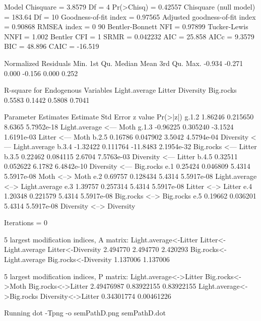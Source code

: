 \documentclass[12pt]{article}
\begin{document}
\begin{Schunk}
\begin{Soutput}
 Model Chisquare =  3.8579   Df =  4 Pr(>Chisq) = 0.42557
 Chisquare (null model) =  183.64   Df =  10
 Goodness-of-fit index =  0.97565
 Adjusted goodness-of-fit index =  0.90868
 RMSEA index =  0   90%
 Bentler-Bonnett NFI =  0.97899
 Tucker-Lewis NNFI =  1.002
 Bentler CFI =  1
 SRMR =  0.042232
 AIC =  25.858
 AICc =  9.3579
 BIC =  48.896
 CAIC =  -16.519

 Normalized Residuals
   Min. 1st Qu.  Median    Mean 3rd Qu.    Max. 
 -0.934  -0.271   0.000  -0.156   0.000   0.252 

 R-square for Endogenous Variables
Light.average        Litter     Diversity     Big.rocks 
       0.5583        0.1442        0.5808        0.7041 

 Parameter Estimates
      Estimate Std Error z value  Pr(>|z|)                                   
g.1.2  1.86246 0.215650    8.6365 5.7952e-18 Light.average <--- Moth         
g.1.3 -0.96225 0.305240   -3.1524 1.6191e-03 Litter <--- Moth                
b.2.5  0.16786 0.047902    3.5042 4.5794e-04 Diversity <--- Light.average    
b.3.4 -1.32422 0.111764  -11.8483 2.1954e-32 Big.rocks <--- Litter           
b.3.5  0.22462 0.084115    2.6704 7.5763e-03 Diversity <--- Litter           
b.4.5  0.32511 0.052622    6.1782 6.4842e-10 Diversity <--- Big.rocks        
e.1    0.25424 0.046809    5.4314 5.5917e-08 Moth <--> Moth                  
e.2    0.69757 0.128434    5.4314 5.5917e-08 Light.average <--> Light.average
e.3    1.39757 0.257314    5.4314 5.5917e-08 Litter <--> Litter              
e.4    1.20348 0.221579    5.4314 5.5917e-08 Big.rocks <--> Big.rocks        
e.5    0.19662 0.036201    5.4314 5.5917e-08 Diversity <--> Diversity        

 Iterations =  0 
\end{Soutput}
\begin{Soutput}
 5 largest modification indices, A matrix:
   Light.average<-Litter    Litter<-Light.average        Litter<-Diversity 
                2.494770                 2.494770                 2.420293 
Big.rocks<-Light.average     Big.rocks<-Diversity 
                1.137006                 1.137006 

  5 largest modification indices, P matrix:
   Light.average<->Litter          Big.rocks<->Moth        Big.rocks<->Litter 
               2.49476987                0.83922155                0.83922155 
Light.average<->Big.rocks        Diversity<->Litter 
               0.34301774                0.00461226 
\end{Soutput}
\begin{Soutput}
Running  dot -Tpng -o semPathD.png  semPathD.dot 
\end{Soutput}
\end{Schunk}
\end{document}
